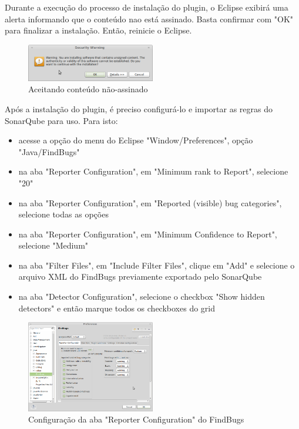 \documentclass[12pt,journal,compsoc]{IEEEtran}
\begin{document}
Durante a execução do processo de instalação do plugin, o Eclipse exibirá uma alerta informando que o conteúdo nao está assinado. Basta confirmar com "OK" para finalizar a instalação. Então, reinicie o Eclipse.

\begin{figure}[ht!]
\centering
\includegraphics[width=0.5\textwidth]{img/eclipse-findbugs-06}
\caption{Aceitando conteúdo não-assinado}
\label{eclipse-findbugs-06}
\end{figure} 

Após a instalação do plugin, é preciso configurá-lo e importar as regras do SonarQube para uso. Para isto:

\begin{itemize}
\item acesse a opção do menu do Eclipse "Window/Preferences", opção "Java/FindBugs"
\item na aba "Reporter Configuration", em "Minimum rank to Report", selecione "20"
\item na aba "Reporter Configuration", em "Reported (visible) bug categories", selecione todas as opções
\item na aba "Reporter Configuration", em "Minimum Confidence to Report", selecione "Medium"
\item na aba "Filter Files", em "Include Filter Files", clique em "Add" e selecione o arquivo XML do FindBugs previamente exportado pelo SonarQube
\item na aba "Detector Configuration", selecione o checkbox "Show hidden detectors" e então marque todos os checkboxes do grid
\end{itemize}

\begin{figure}[ht!]
\centering
\includegraphics[width=0.5\textwidth]{img/eclipse-findbugs-07}
\caption{Configuração da aba "Reporter Configuration" do FindBugs}
\label{eclipse-findbugs-07}
\end{figure} 
\end{document}

